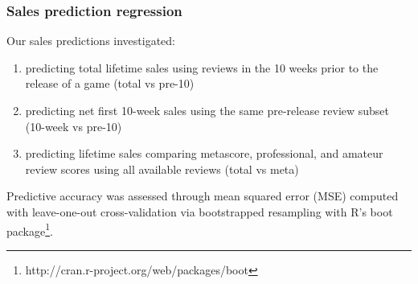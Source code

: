 \documentclass[letterpaper]{article}
\begin{document}
\subsubsection{Sales prediction regression}
Our sales predictions investigated: 
\begin{enumerate}
\item predicting total lifetime sales using reviews in the 10 weeks prior to the release of a game (total vs pre-10)
\item predicting net first 10-week sales using the same pre-release review subset (10-week vs pre-10)
\item predicting lifetime sales comparing metascore, professional, and amateur review scores using all available reviews (total vs meta)
\end{enumerate}
Predictive accuracy was assessed through mean squared error (MSE)
computed with leave-one-out cross-validation via bootstrapped resampling with R's boot package\footnote{http://cran.r-project.org/web/packages/boot}.
\end{document}
